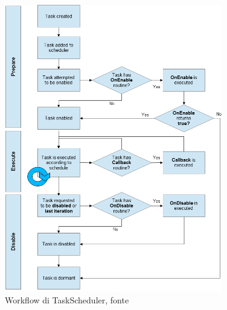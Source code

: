 \documentclass[12pt,a4paper]{report}
\begin{document}
\begin{figure}
	\begin{center}
		\includegraphics[width=0.85\textwidth]{Immagini/TaskScheduler_html.png}
		\caption{Workflow di TaskScheduler, fonte \cite{taskScheduler}}
		\label{fig:schemaTaskScheduler}
	\end{center}
\end{figure}
\end{document}
